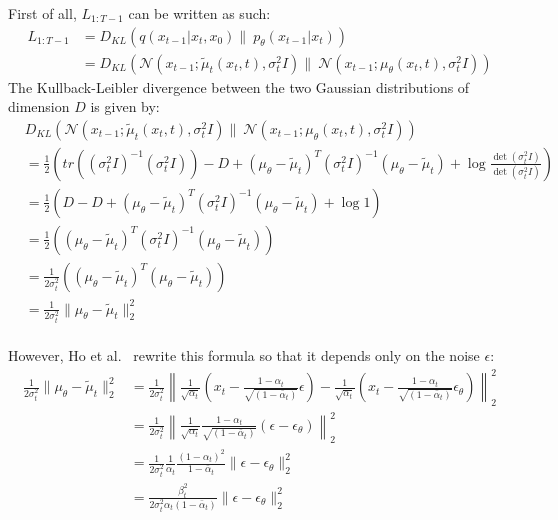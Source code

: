 \documentclass{article}
\numberwithin{equation}{section}
\numberwithin{figure}{section}
\begin{document}
First of all, $L_{1: T-1}$ can be written as such:
\begin{align}
  L_{1:T-1} &= D_{KL}\left(q\left(x_{t-1} | x_t, x_0\right) \| \: p_{\theta}\left(x_{t-1} | x_t\right)\right) \\
  &= D_{KL}\left(\mathcal{N} (x_{t-1}; \tilde{\mu}_t \left(x_t, t \right), \sigma^2_t I ) \| \: \mathcal{N} \left( x_{t-1} ; \mu_{\theta}(x_t, t), \sigma^2_t I  \right) \right)
\end{align}
{
  \allowdisplaybreaks
The Kullback-Leibler divergence between the two Gaussian distributions of dimension $D$ is given by:
  \begin{align}
    & D_{KL}\left(\mathcal{N} (x_{t-1}; \tilde{\mu}_t \left(x_t, t \right), \sigma^2_t I ) \| \: \mathcal{N} \left( x_{t-1} ; \mu_{\theta}(x_t, t), \sigma^2_t I  \right) \right) \\
    &= \frac{1}{2} \left( tr\left( (\sigma^2_t I)^{-1} (\sigma^2_t I) \right) - D + \left( \mu_{\theta} - \tilde{\mu}_t \right)^T (\sigma^2_t I)^{-1} \left( \mu_{\theta} - \tilde{\mu}_t \right) + \log \frac{\det(\sigma^2_t I)}{\det(\sigma^2_t I)} \right) \\
    &= \frac{1}{2} \left( D - D + \left( \mu_{\theta} - \tilde{\mu}_t \right)^T (\sigma^2_t I)^{-1} \left( \mu_{\theta} - \tilde{\mu}_t \right) + \log 1 \right) \\
    &= \frac{1}{2} \left( \left( \mu_{\theta} - \tilde{\mu}_t \right)^T (\sigma^2_t I)^{-1} \left( \mu_{\theta} - \tilde{\mu}_t \right) \right) \\
    &= \frac{1}{2 \sigma^2_t} \left( \left( \mu_{\theta} - \tilde{\mu}_t \right)^T \left( \mu_{\theta} - \tilde{\mu}_t \right) \right) \\
    &= \frac{1}{2 \sigma^2_t} \| \mu_{\theta} - \tilde{\mu}_t \|_2^2
  \end{align}
  \\
  However, Ho et al.~\cite{ho2020denoising} rewrite this formula so that it depends only on the noise $\epsilon$:
  \begin{align}
    \frac{1}{2 \sigma^2_t} \| \mu_{\theta} - \tilde{\mu}_t \|_2^2 &= \frac{1}{2 \sigma^2_t} \left\| \frac{1}{\sqrt{\alpha_t}} \left( x_t - \frac{1 - \alpha_t}{\sqrt{(1 - \bar{\alpha}_t)}} \epsilon \right) - \frac{1}{\sqrt{\alpha_t}} \left( x_t - \frac{1 - \alpha_t}{\sqrt{(1 - \bar{\alpha}_t)}} \epsilon_\theta \right)\right\|_2^2 \\
    &= \frac{1}{2 \sigma^2_t} \left\| \frac{1}{\sqrt{\alpha_t}} \frac{1 - \alpha_t}{\sqrt{(1 - \bar{\alpha}_t)}} (\epsilon - \epsilon_\theta) \right\|_2^2 \\
    &= \frac{1}{2 \sigma^2_t} \frac{1}{\alpha_t} \frac{(1 - \alpha_t)^2}{1 - \bar{\alpha}_t} \| \epsilon - \epsilon_\theta \|_2^2 \\
    &= \frac{\beta_t^2}{2 \sigma^2_t \alpha_t (1 - \bar{\alpha}_t)} \| \epsilon - \epsilon_\theta \|_2^2
  \end{align}
}
\end{document}
